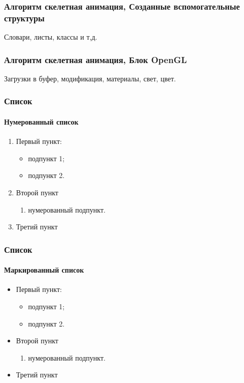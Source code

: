 \documentclass{beamer}
\begin{document}
\begin{frame}
\frametitle{Алгоритм скелетная анимация, Созданные вспомогательные структуры}
	Словари, листы, классы и т,д.
\end{frame}




\begin{frame}
\frametitle{Алгоритм скелетная анимация, Блок OpenGL}
	Загрузки в буфер, модификация, материалы, свет, цвет.
\end{frame}




\begin{frame}
\frametitle{Список}
\framesubtitle{Нумерованный список}
	\begin{enumerate} 
		\item Первый пункт:
		\begin{itemize}
			\item подпункт 1;
			\item подпункт 2.
		\end{itemize}
		\item Второй пункт
		\begin{enumerate}
			\item нумерованный подпункт.
		\end{enumerate} 
		\item Третий пункт
	\end{enumerate} 
\end{frame}

\begin{frame}
\frametitle{Список}
\framesubtitle{Маркированный список}
	\begin{itemize}
		\item Первый пункт:
		\begin{itemize}
			\item подпункт 1;
			\item подпункт 2.
		\end{itemize}
		\item Второй пункт
		\begin{enumerate}
			\item нумерованный подпункт.
		\end{enumerate}
		\item Третий пункт
	\end{itemize}
\end{frame}
\end{document}
